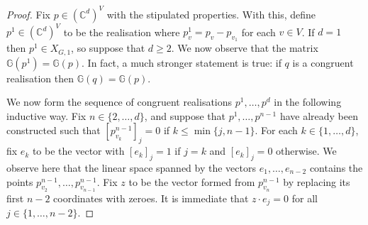 \documentclass[11pt]{article}
\theoremstyle{definition}
\numberwithin{equation}{section}
\begin{document}
\begin{proof}
	Fix $p \in (\mathbb{C}^d)^V$ with the stipulated properties.
	With this,
	define $p^1 \in (\mathbb{C}^d)^V$ to be the realisation where $p^1_v = p_v - p_{v_1}$ for each $v \in V$.
	If $d=1$ then $p^1 \in X_{G,1}$,
	so suppose that $d \geq 2$.
	We now observe that the matrix $\mathbb{G}(p^1) = \mathbb{G}(p)$.
	In fact, a much stronger statement is true:
	if $q$ is a congruent realisation then $\mathbb{G}(q) = \mathbb{G}(p)$.
	
	We now form the sequence of congruent realisations $p^1,\ldots,p^d$ in the following inductive way.
	Fix $n \in \{2,\ldots,d\}$,
	and suppose that $p^1,\ldots,p^{n-1}$ have already been constructed such that $[p^{n-1}_{v_k}]_j =0$ if $k \leq \min \{j, n-1\}$.
	For each $k \in \{1,\ldots,d\}$,
	fix $e_k$ to be the vector with $[e_k]_j = 1$ if $j=k$ and $[e_k]_j = 0$ otherwise.
	We observe here that the linear space spanned by the vectors $e_1,\ldots, e_{n-2}$ contains the points $p^{n-1}_{v_2},\ldots, p^{n-1}_{v_{n-1}}$.
	Fix $z$ to be the vector formed from $p^{n-1}_{v_{n}}$ by replacing its first $n-2$ coordinates with zeroes.
	It is immediate that $z \cdot e_j = 0$ for all $j \in \{1 , \ldots, n-2\}$.
	

\end{proof}
\end{document}
